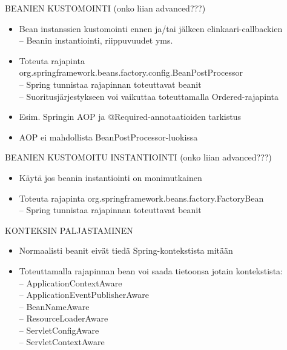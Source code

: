 \documentclass[hyperref={pdfauthor=\AUTHOR},14pt]{beamer}
\begin{document}
\begin{frame}[t, fragile]{BEANIEN KUSTOMOINTI (onko liian advanced???) }
\begin{itemize}
 \item Bean instanssien kustomointi ennen ja/tai jälkeen elinkaari-callbackien\\
 -- Beanin instantiointi, riippuvuudet yms.
 \item Toteuta rajapinta org.springframework.beans.factory.config.BeanPostProcessor\\
 -- Spring tunnistaa rajapinnan toteuttavat beanit\\
 -- Suoritusjärjestykseen voi vaikuttaa toteuttamalla Ordered-rajapinta\\
 \item Esim. Springin AOP ja @Required-annotaatioiden tarkistus 
 \item AOP ei mahdollista BeanPostProcessor-luokissa
\end{itemize}
\end{frame}
\begin{frame}[t, fragile]{BEANIEN KUSTOMOITU INSTANTIOINTI (onko liian advanced???) }
\begin{itemize}
 \item Käytä jos beanin instantiointi on monimutkainen
 \item Toteuta rajapinta org.springframework.beans.factory.FactoryBean\\
 -- Spring tunnistaa rajapinnan toteuttavat beanit
\end{itemize}
\end{frame}
\begin{frame}[t, fragile]{KONTEKSIN PALJASTAMINEN}
\begin{itemize}
\item Normaalisti beanit eivät tiedä Spring-kontekstista mitään
 \item Toteuttamalla rajapinnan bean voi saada tietoonsa jotain kontekstista:\\
 -- ApplicationContextAware \\
 -- ApplicationEventPublisherAware \\
 -- BeanNameAware \\
 -- ResourceLoaderAware \\
 -- ServletConfigAware \\
 -- ServletContextAware \\
\end{itemize}
\end{frame}
\end{document}
